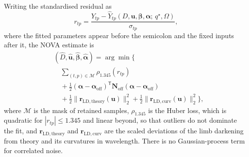 Writing the standardised residual as
\begin{equation}
 r_{tp}=\frac{Y_{tp}-\widehat Y_{tp}
 (D,\bm{u},\bm{\beta},\bm{\alpha};\,q^\star,\Omega)}{\sigma_{tp}},
 \label{eq:residual}
\end{equation}
where the fitted parameters appear before the semicolon and the fixed inputs
after it, the NOVA estimate is
\begin{equation}
\begin{split}
 &(\widehat D,\widehat{\bm{u}},\widehat{\bm{\beta}},
  \widehat{\bm{\alpha}})
 = \arg\min\Big\{ \\
 &\quad\sum_{(t,p)\in\mathcal{M}}\rho_{1.345}(r_{tp}) \\
 &\quad+\tfrac{1}{2}(\bm{\alpha}-\bm{\alpha}_{\mathrm{off}})^{\mathsf T}
   \bm{N}_{\mathrm{off}}(\bm{\alpha}-\bm{\alpha}_{\mathrm{off}}) \\
 &\quad+\tfrac{1}{2}\|\bm{r}_{\mathrm{LD,theory}}(\bm{u})\|_2^2
  +\tfrac{1}{2}\|\bm{r}_{\mathrm{LD,curv}}(\bm{u})\|_2^2
 \Big\},
\end{split}
 \label{eq:objective}
\end{equation}
where $\mathcal{M}$ is the mask of retained samples, $\rho_{1.345}$ is the
Huber loss, which is quadratic for $|r_{tp}|\leq1.345$ and linear beyond, so
that outliers do not dominate the fit, and $\bm{r}_{\mathrm{LD,theory}}$ and
$\bm{r}_{\mathrm{LD,curv}}$ are the scaled deviations of the limb darkening
from theory and its curvatures in wavelength. There is no Gaussian-process
term for correlated noise.

